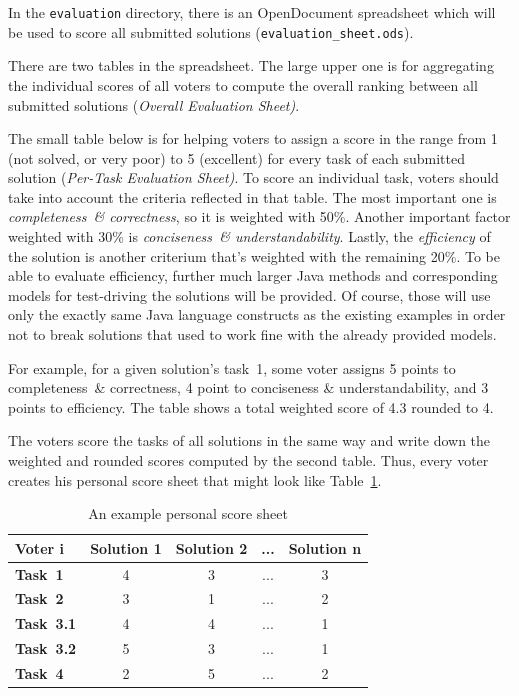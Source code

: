 \documentclass[11pt]{article}
\begin{document}
In the \verb|evaluation| directory, there is an OpenDocument spreadsheet which
will be used to score all submitted solutions (\verb|evaluation_sheet.ods|).

There are two tables in the spreadsheet.  The large upper one is for
aggregating the individual scores of all voters to compute the overall ranking
between all submitted solutions (\emph{Overall Evaluation Sheet)}.

The small table below is for helping voters to assign a score in the range from
1 (not solved, or very poor) to 5 (excellent) for every task of each submitted
solution (\emph{Per-Task Evaluation Sheet)}.  To score an individual task,
voters should take into account the criteria reflected in that table.  The most
important one is \emph{completeness~\& correctness}, so it is weighted with
50\%.  Another important factor weighted with 30\% is \emph{conciseness~\&
  understandability}.  Lastly, the \emph{efficiency} of the solution is another
criterium that's weighted with the remaining 20\%.  To be able to evaluate
efficiency, further much larger Java methods and corresponding models for
test-driving the solutions will be provided.  Of course, those will use only
the exactly same Java language constructs as the existing examples in order not
to break solutions that used to work fine with the already provided models.

For example, for a given solution's task~1, some voter assigns 5 points to
completeness~\& correctness, 4 point to conciseness \& understandability, and 3
points to efficiency.  The table shows a total weighted score of 4.3 rounded to
4.

The voters score the tasks of all solutions in the same way and write down the
weighted and rounded scores computed by the second table.  Thus, every voter
creates his personal score sheet that might look like
Table~\ref{tab:personal-score-sheet}.

\begin{table}[h!]
  \centering
  \begin{tabular}[h!]{| l | c | c | c | c |}
    \hline
    \textbf{Voter i}& \textbf{Solution 1} & \textbf{Solution 2} & ... & \textbf{Solution n}\\
    \hline
    \textbf{Task~1} & 4 & 3 & ... & 3\\
    \textbf{Task~2} & 3 & 1 & ... & 2\\
    \textbf{Task~3.1} & 4 & 4 & ... & 1\\
    \textbf{Task~3.2} & 5 & 3 & ... & 1\\
    \textbf{Task~4} & 2 & 5 & ... & 2\\
    \hline
  \end{tabular}
  \caption{An example personal score sheet}
  \label{tab:personal-score-sheet}
\end{table}
\end{document}

